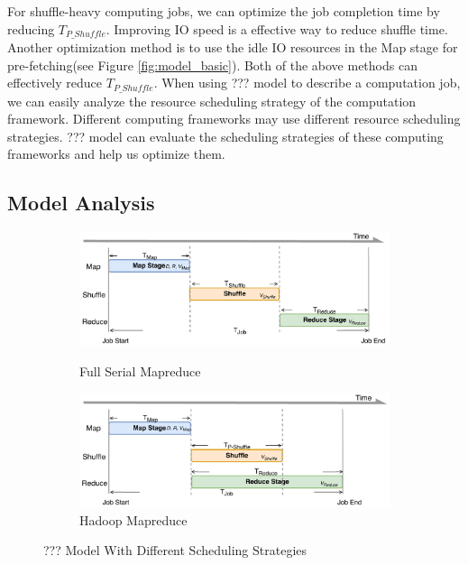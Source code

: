 {For shuffle-heavy computing jobs, we can optimize the job completion time by reducing \(T_{P\_Shuffle}\). Improving IO speed is a effective way to reduce shuffle time. Another optimization method is to use the idle IO resources in the Map stage for pre-fetching(see Figure \ref{fig:model_basic}). Both of the above methods can effectively reduce \(T_{P\_Shuffle}\). When using ??? model to describe a computation job, we can easily analyze the resource scheduling strategy of the computation framework. Different computing frameworks may use different resource scheduling strategies. ??? model can evaluate the scheduling strategies of these computing frameworks and help us optimize them.

\subsection{Model Analysis}\label{model_analysis}

\begin{figure}
	\centering
	\begin{minipage}[hb]{\linewidth}
		\begin{subfigure}{\linewidth}
			\begin{minipage}{\linewidth}
				\includegraphics[width=\linewidth]{fig/model_original}
				\caption{\color{blue}Full Serial Mapreduce}
				\label{fig:model_original}
			\end{minipage}
			\begin{minipage}{\linewidth}
				\includegraphics[width=\linewidth]{fig/model_hadoop}
				\caption{\color{blue}Hadoop Mapreduce}
				\label{fig:model_hadoop}
			\end{minipage}
		\end{subfigure}
		\caption{\color{blue}??? Model With Different Scheduling Strategies}
		\label{fig:model_strategies}
	\end{minipage}
\end{figure}

}

